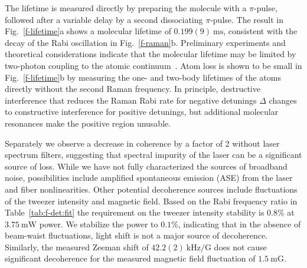 \documentclass[aps,prl,twocolumn,10pt,superscriptaddress]{revtex4-1}
\begin{document}
The lifetime is measured directly by preparing the molecule with a $\pi$-pulse,
followed after a variable delay by a second dissociating $\pi$-pulse.
The result in Fig.~\ref{f-lifetime}a shows a molecular lifetime of $0.199(9)~\mathrm{ms}$,
consistent with the decay of the Rabi oscillation in Fig.~\ref{f-raman}b. Preliminary experiments and theoretical considerations indicate that the molecular lifetime may be limited by two-photon coupling to the atomic continuum~\cite{YichaoYu}.  Atom loss is shown to be small in Fig.~\ref{f-lifetime}b by measuring the one- and
two-body lifetimes of the atoms directly without the second Raman frequency. In principle, destructive interference that reduces the Raman Rabi rate for negative detunings $\Delta$ changes to constructive interference for positive detunings, but additional molecular resonances make the positive region unusable.

Separately we observe a decrease in coherence by a factor of 2 without laser spectrum filters,
suggesting that spectral impurity of the laser can be a significant source of loss.   While we have not fully characterized the sources
of broadband noise, possibilities include amplified spontaneous emission (ASE) from the laser and fiber nonlinearities. Other potential decoherence sources include
fluctuations of the tweezer intensity and magnetic field.
Based on the Rabi frequency ratio in Table~\ref{tab:f-det:fit}
the requirement on the tweezer intensity stability is $0.8\mathrm{\%}$ at $3.75~\mathrm{mW}$ power. We stabilize the power to $0.1\mathrm{\%}$, indicating that in the absence of beam-waist fluctuations, light shift is not a major source of decoherence.
Similarly, the measured Zeeman shift of $42.2(2)~\mathrm{kHz/G}$
does not cause significant decoherence for the measured magnetic field
fluctuation of $1.5~\mathrm{mG}$.


\end{document}
